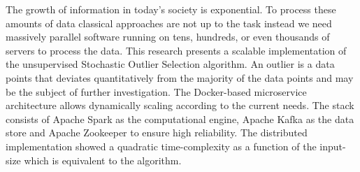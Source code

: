 The growth of information in today’s society is exponential. To process these amounts of data classical approaches are not up to the task instead we need massively parallel software running on tens, hundreds, or even thousands of servers to process the data. This research presents a scalable implementation of the unsupervised Stochastic Outlier Selection algorithm. An outlier is a data points that deviates quantitatively from the majority of the data points and may be the subject of further investigation. The Docker-based microservice architecture allows dynamically scaling according to the current needs. The stack consists of Apache Spark as the computational engine, Apache Kafka as the data store and Apache Zookeeper to ensure high reliability. The distributed implementation showed a quadratic time-complexity as a function of the input-size which is equivalent to the algorithm.